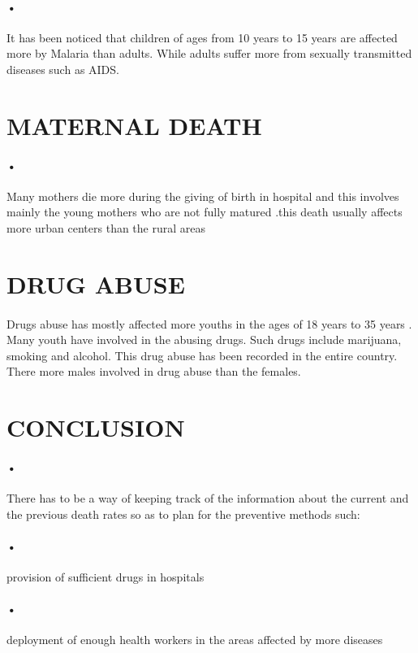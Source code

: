 \documentclass[12pt]{article}
\begin{document}
\paragraph{•}It has been noticed that children of ages from 10 years to 15 years are affected more by Malaria than adults. While adults suffer more from sexually transmitted diseases such as AIDS.

\section{MATERNAL DEATH}
\paragraph{•}Many mothers die more during the giving of birth in hospital   and this involves mainly the young mothers who are not fully matured .this death usually affects more urban centers than the rural areas
\section{DRUG ABUSE}
\paragraph{}Drugs abuse has mostly affected more youths in the ages of 18 years to 35 years . Many youth have involved in the abusing drugs. Such drugs include marijuana, smoking and alcohol. This drug abuse has been recorded in the entire country. There more males involved in drug abuse than the females.


\section{CONCLUSION}

\paragraph{•}There has to be a way of keeping track of the information about the current and the previous death rates so as to plan for the preventive methods such:
\paragraph{•}provision of sufficient drugs in hospitals
\paragraph{•}deployment of enough health workers in the areas affected by more diseases
\end{document}
